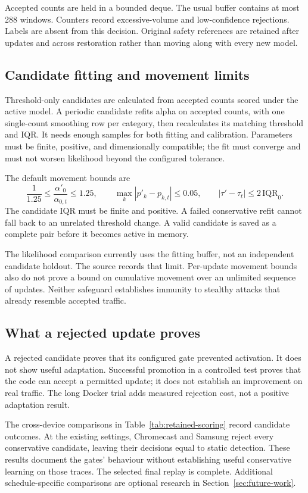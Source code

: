 Accepted counts are held in a bounded deque. The usual buffer contains at most
288 windows. Counters record excessive-volume and low-confidence rejections.
Labels are absent from this decision. Original safety references are retained
after updates and across restoration rather than moving along with every new
model.

\subsection{Candidate fitting and movement limits}

Threshold-only candidates are calculated from accepted counts scored under the
active model. A periodic candidate refits alpha on accepted counts, with one
single-count smoothing row per category, then recalculates its matching
threshold and IQR. It needs enough samples for both fitting and calibration.
Parameters must be finite, positive, and dimensionally compatible; the fit
must converge and must not worsen likelihood beyond the configured tolerance.

The default movement bounds are
\[
\frac{1}{1.25}\leq
\frac{\alpha'_0}{\alpha_{0,t}}\leq1.25,\qquad
\max_k|p'_k-p_{k,t}|\leq0.05,\qquad
|\tau'-\tau_t|\leq2\,\mathrm{IQR}_0.
\]
The candidate IQR must be finite and positive. A failed conservative refit
cannot fall back to an unrelated threshold change. A valid candidate is saved
as a complete pair before it becomes active in memory.

The likelihood comparison currently uses the fitting buffer, not an independent
candidate holdout. The source records that limit. Per-update movement bounds
also do not prove a bound on cumulative movement over an unlimited sequence of
updates. Neither safeguard establishes immunity to stealthy attacks that
already resemble accepted traffic.

\subsection{What a rejected update proves}

A rejected candidate proves that its configured gate prevented activation.
It does not show useful adaptation. Successful promotion in a controlled test
proves that the code can accept a permitted update; it does not establish an
improvement on real traffic. The long Docker trial adds measured rejection cost,
not a positive adaptation result.

The cross-device comparisons in Table~\ref{tab:retained-scoring} record candidate
outcomes. At the existing settings, Chromecast and Samsung reject every
conservative candidate, leaving their decisions equal to static detection.
These results document the gates' behaviour without establishing useful
conservative learning on those traces. The selected final replay is complete. Additional schedule-specific
comparisons are optional research in Section~\ref{sec:future-work}.

